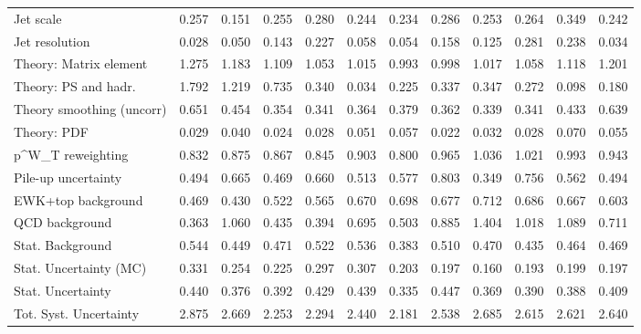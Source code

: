 \begin{tabular}{l|p{0.6cm}p{0.6cm}p{0.6cm}p{0.6cm}p{0.6cm}p{0.6cm}p{0.6cm}p{0.6cm}p{0.6cm}p{0.6cm}p{0.6cm}}
Jet scale                                & 0.257 & 0.151 & 0.255 & 0.280 & 0.244 & 0.234 & 0.286 & 0.253 & 0.264 & 0.349 & 0.242 \\
Jet resolution                           & 0.028 & 0.050 & 0.143 & 0.227 & 0.058 & 0.054 & 0.158 & 0.125 & 0.281 & 0.238 & 0.034 \\
Theory: Matrix element                   & 1.275 & 1.183 & 1.109 & 1.053 & 1.015 & 0.993 & 0.998 & 1.017 & 1.058 & 1.118 & 1.201 \\
Theory: PS and hadr.                     & 1.792 & 1.219 & 0.735 & 0.340 & 0.034 & 0.225 & 0.337 & 0.347 & 0.272 & 0.098 & 0.180 \\
Theory smoothing (uncorr)                & 0.651 & 0.454 & 0.354 & 0.341 & 0.364 & 0.379 & 0.362 & 0.339 & 0.341 & 0.433 & 0.639 \\
Theory: PDF                              & 0.029 & 0.040 & 0.024 & 0.028 & 0.051 & 0.057 & 0.022 & 0.032 & 0.028 & 0.070 & 0.055 \\
p^{W}_{T} reweighting                    & 0.832 & 0.875 & 0.867 & 0.845 & 0.903 & 0.800 & 0.965 & 1.036 & 1.021 & 0.993 & 0.943 \\
Pile-up uncertainty                      & 0.494 & 0.665 & 0.469 & 0.660 & 0.513 & 0.577 & 0.803 & 0.349 & 0.756 & 0.562 & 0.494 \\
EWK+top background                       & 0.469 & 0.430 & 0.522 & 0.565 & 0.670 & 0.698 & 0.677 & 0.712 & 0.686 & 0.667 & 0.603 \\
QCD background                           & 0.363 & 1.060 & 0.435 & 0.394 & 0.695 & 0.503 & 0.885 & 1.404 & 1.018 & 1.089 & 0.711 \\
Stat. Background                         & 0.544 & 0.449 & 0.471 & 0.522 & 0.536 & 0.383 & 0.510 & 0.470 & 0.435 & 0.464 & 0.469 \\
Stat. Uncertainty (MC)                   & 0.331 & 0.254 & 0.225 & 0.297 & 0.307 & 0.203 & 0.197 & 0.160 & 0.193 & 0.199 & 0.197 \\
\hline
Stat. Uncertainty                        & 0.440 & 0.376 & 0.392 & 0.429 & 0.439 & 0.335 & 0.447 & 0.369 & 0.390 & 0.388 & 0.409 \\
\hline
Tot. Syst. Uncertainty                   & 2.875 & 2.669 & 2.253 & 2.294 & 2.440 & 2.181 & 2.538 & 2.685 & 2.615 & 2.621 & 2.640 \\
\hline
\end{tabular}

